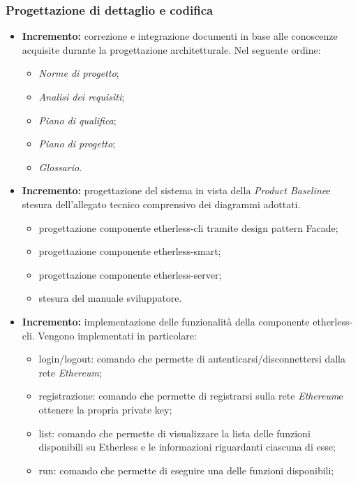 \subsubsection{Progettazione di dettaglio e codifica}
\begin{itemize}
	\item \textbf{ Incremento:} correzione e integrazione documenti in base alle conoscenze acquisite durante la progettazione architetturale. Nel seguente ordine:
  \begin{itemize}
    \item \textit{Norme di progetto}\docs;
    \item \textit{Analisi dei requisiti}\docs;
    \item \textit{Piano di qualifica}\docs;
    \item \textit{Piano di progetto}\docs;
    \item \textit{Glossario}\docs.
  \end{itemize}
	\item \textbf{ Incremento:} progettazione del sistema in vista della \textit{Product Baseline}\glo e stesura dell'allegato tecnico comprensivo dei diagrammi adottati.
	\begin{itemize}
		\item progettazione componente etherless-cli tramite design pattern Facade;
		\item progettazione componente etherless-smart;
		\item progettazione componente etherless-server;
		\item stesura del manuale sviluppatore.
	\end{itemize}
	\item \textbf{ Incremento:} implementazione delle funzionalità della componente etherless-cli.
  Vengono implementati in particolare:
  \begin{itemize}
    \item login/logout: comando che permette di autenticarsi/disconnettersi dalla rete \textit{Ethereum}\glos;
    \item registrazione: comando che permette di registrarsi sulla rete \textit{Ethereum}\glo e ottenere la propria private key;
    \item list: comando che permette di visualizzare la lista delle funzioni disponibili su Etherless e le informazioni riguardanti ciascuna di esse;
    \item run: comando che permette di eseguire una delle funzioni disponibili;

\end{itemize}
\end{itemize}
